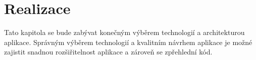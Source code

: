 \chapter{Realizace}
\label{ch:implementation}
Tato kapitola se bude zabývat konečným výběrem technologií a architekturou aplikace. Správným výběrem technologií a kvalitním návrhem aplikace je možné zajistit snadnou rozšiřitelnost aplikace a zároveň se zpřehlední kód.









